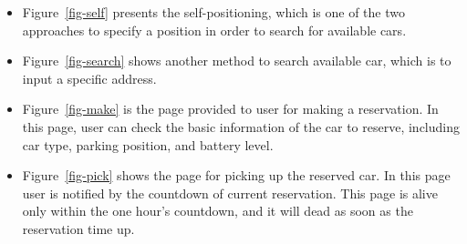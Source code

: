 \documentclass[a4paper,11pt]{article}
\begin{document}
\begin{itemize}
	\item Figure~\ref{fig-self} presents the self-positioning, which is one of the two approaches to specify a position in order to search for available cars.
	\item Figure~\ref{fig-search} shows another method to search available car, which is to input a specific address.
	\item Figure~\ref{fig-make} is the page provided to user for making a reservation. In this page, user can check the basic information of the car to reserve, including car type, parking position, and battery level.
	\item Figure~\ref{fig-pick} shows the page for picking up the reserved car. In this page user is notified by the countdown of current reservation. This page is alive only within the one hour's countdown, and it will dead as soon as the reservation time up.
\begin{figure}[H]
  \centering
  \begin{minipage}[t]{.35\linewidth}

\end{minipage}
\end{figure}
\end{itemize}
\end{document}
